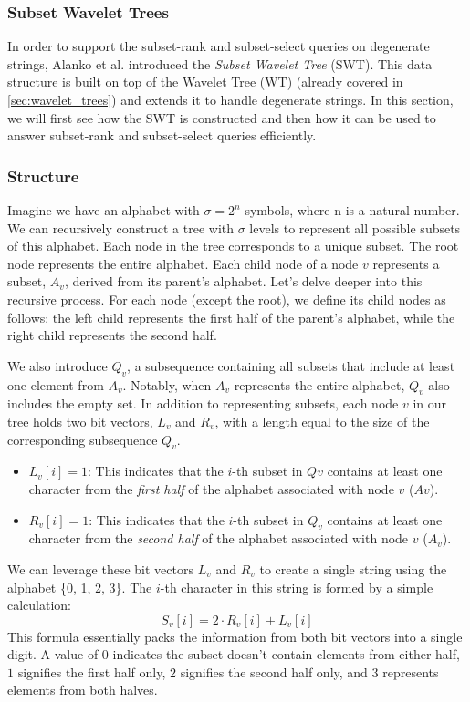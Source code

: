 \subsubsection{Subset Wavelet Trees} \label{sec:subset_wavelet_trees}
In order to support the subset-rank and subset-select queries on degenerate strings, Alanko et al. \cite{SubsetWT} introduced the \emph{Subset Wavelet Tree} (SWT). This data structure is built on top of the Wavelet Tree (WT) \cite{GrossiWT2003} (already covered in \autoref{sec:wavelet_trees}) and extends it to handle degenerate strings. In this section, we will first see how the SWT is constructed and then how it can be used to answer subset-rank and subset-select queries efficiently.

\subsubsection*{Structure} \label{sec:swt_structure}

Imagine we have an alphabet with $\sigma = 2^n$ symbols, where n is a natural number. We can recursively construct a tree with $\sigma$ levels to represent all possible subsets of this alphabet. Each node in the tree corresponds to a unique subset. The root node represents the entire alphabet. Each child node of a node $v$ represents a subset, $A_v$, derived from its parent's alphabet. Let's delve deeper into this recursive process. For each node (except the root), we define its child nodes as follows: the left child represents the first half of the parent's alphabet, while the right child represents the second half.

\noindent We also introduce $Q_v$, a subsequence containing all subsets that include at least one element from $A_v$. Notably, when $A_v$ represents the entire alphabet, $Q_v$ also includes the empty set. In addition to representing subsets, each node $v$ in our tree holds two bit vectors, $L_v$ and $R_v$, with a length equal to the size of the corresponding subsequence $Q_v$.
\begin{itemize}
    \item $L_v[i] = 1$: This indicates that the $i$-th subset in $Qv$ contains at least one character from the \emph{first half} of the alphabet associated with node $v$ ($Av$).
    \item $R_v[i] = 1$: This indicates that the $i$-th subset in $Q_v$ contains at least one character from the \emph{second half} of the alphabet associated with node $v$ ($A_v$).
\end{itemize}
We can leverage these bit vectors $L_v$ and $R_v$ to create a single string using the alphabet \{0, 1, 2, 3\}. The $i$-th character in this string is formed by a simple calculation:
\begin{equation}
    S_v[i] = 2 \cdot R_v[i] + L_v[i]
\end{equation}
This formula essentially packs the information from both bit vectors into a single digit. A value of $0$ indicates the subset doesn't contain elements from either half, $1$ signifies the first half only, $2$ signifies the second half only, and $3$ represents elements from both halves.

